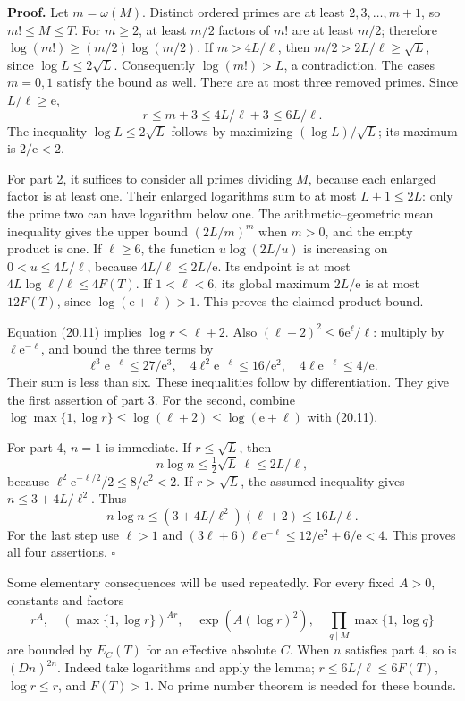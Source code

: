 \documentclass[
  11pt,
  a4paper,
]{article}
\begin{document}
\textbf{Proof.} Let \(m=\omega(M)\). Distinct ordered primes are at
least \(2,3,\ldots,m+1\), so \(m!\le M\le T\). For \(m\ge2\), at least
\(m/2\) factors of \(m!\) are at least \(m/2\); therefore
\(\log(m!)\ge(m/2)\log(m/2)\). If \(m>4L/\ell\), then
\(m/2>2L/\ell\ge\sqrt L\), since \(\log L\le2\sqrt L\). Consequently
\(\log(m!)>L\), a contradiction. The cases \(m=0,1\) satisfy the bound
as well. There are at most three removed primes. Since
\(L/\ell\ge\mathrm e\), \[
 r\le m+3\le4L/\ell+3\le6L/\ell.
 \tag{20.11}
\] The inequality \(\log L\le2\sqrt L\) follows by maximizing
\((\log L)/\sqrt L\); its maximum is \(2/\mathrm e<2\).

For part 2, it suffices to consider all primes dividing \(M\), because
each enlarged factor is at least one. Their enlarged logarithms sum to
at most \(L+1\le2L\): only the prime two can have logarithm below one.
The arithmetic--geometric mean inequality gives the upper bound
\((2L/m)^m\) when \(m>0\), and the empty product is one. If
\(\ell\ge6\), the function \(u\log(2L/u)\) is increasing on
\(0<u\le4L/\ell\), because \(4L/\ell\le2L/\mathrm e\). Its endpoint is
at most \(4L\log\ell/\ell\le4F(T)\). If \(1<\ell<6\), its global maximum
\(2L/\mathrm e\) is at most \(12F(T)\), since
\(\log(\mathrm e+\ell)>1\). This proves the claimed product bound.

Equation (20.11) implies \(\log r\le\ell+2\). Also
\((\ell+2)^2\le6\mathrm e^\ell/\ell\): multiply by
\(\ell\mathrm e^{-\ell}\), and bound the three terms by \[
 \ell^3\mathrm e^{-\ell}\le27/\mathrm e^3,\quad
 4\ell^2\mathrm e^{-\ell}\le16/\mathrm e^2,\quad
 4\ell\mathrm e^{-\ell}\le4/\mathrm e.
 \] Their sum is less than six. These inequalities follow by
differentiation. They give the first assertion of part 3. For the
second, combine
\(\log\max\{1,\log r\}\le\log(\ell+2)\le\log(\mathrm e+\ell)\) with
(20.11).

For part 4, \(n=1\) is immediate. If \(r\le\sqrt L\), then \[
 n\log n\le\tfrac12\sqrt L\,\ell\le2L/\ell,
 \] because \(\ell^2\mathrm e^{-\ell/2}/2\le8/\mathrm e^2<2\). If
\(r>\sqrt L\), the assumed inequality gives \(n\le3+4L/\ell^2\). Thus \[
 n\log n\le(3+4L/\ell^2)(\ell+2)
       \le16L/\ell.
 \tag{20.12}
\] For the last step use \(\ell>1\) and \((3\ell+6)\ell\mathrm e^{-\ell}
\le12/\mathrm e^2+6/\mathrm e<4\). This proves all four assertions.
\(\square\)

Some elementary consequences will be used repeatedly. For every fixed
\(A>0\), constants and factors \[
 r^A,\quad (\max\{1,\log r\})^{Ar},\quad
 \exp(A(\log r)^2),\quad \prod_{q\mid M}\max\{1,\log q\}
 \tag{20.13}
\] are bounded by \(E_C(T)\) for an effective absolute \(C\). When \(n\)
satisfies part 4, so is \((Dn)^{2n}\). Indeed take logarithms and apply
the lemma; \(r\le6L/\ell\le6F(T)\), \(\log r\le r\), and \(F(T)>1\). No
prime number theorem is needed for these bounds.
\end{document}
